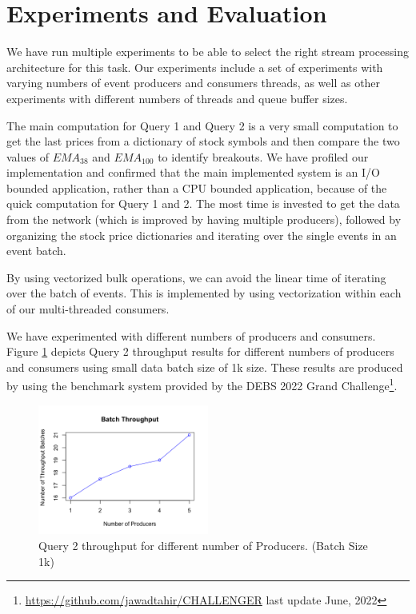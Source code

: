 \section{Experiments and Evaluation}\label{sec:experiments}

We have run multiple experiments to be able to select the right stream processing architecture for this task. 
Our experiments include a set of experiments with varying numbers of event producers and consumers threads, as well as 
other experiments with different numbers of threads and queue buffer sizes.

The main computation for Query 1 and Query 2 is a very small computation to get the last prices from a dictionary of stock symbols and then
compare the two values of $EMA_{38}$ and $EMA_{100}$ to identify breakouts. We have profiled our implementation and confirmed that the main implemented system
is an I/O bounded application, rather than a CPU bounded application, because of the quick computation for Query 1 and 2. The most time is
invested to get the data from the network (which is improved by having multiple producers), followed by organizing the stock price
dictionaries and iterating over the single events in an event batch.

By using vectorized bulk operations, we can avoid the linear time of iterating over the batch of events. This is implemented by using
vectorization within each of our multi-threaded consumers.

We have experimented with different numbers of producers and consumers.
Figure \ref{fig:evaluation} depicts Query 2 throughput results for different numbers of producers and consumers using small data batch size of 1k size. 
These results are produced by using the benchmark system provided by the DEBS 2022 Grand Challenge\footnote{\url{https://github.com/jawadtahir/CHALLENGER} last update June, 2022}.


\begin{figure}[]
    \begin{center}
        \includegraphics[width=0.5\textwidth]{./images/throughput.png}
        \caption{Query 2 throughput for different number of Producers. (Batch Size 1k)}
        \label{fig:evaluation}
    \end{center}
\end{figure}


